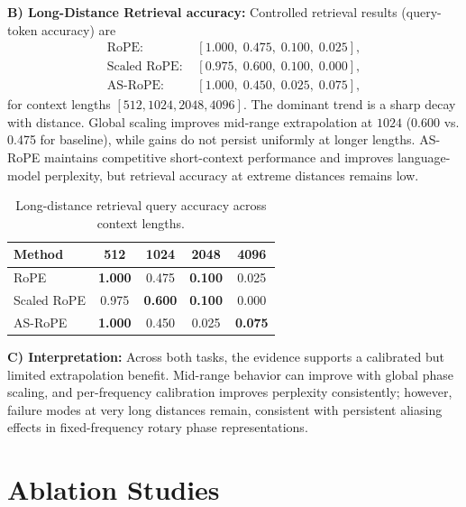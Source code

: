\documentclass[conference]{IEEEtran}
\begin{document}
\textbf{B) Long-Distance Retrieval accuracy:} Controlled retrieval results (query-token accuracy) are
\begin{align}
\text{RoPE: } & [1.000,\;0.475,\;0.100,\;0.025], \\
\text{Scaled RoPE: } & [0.975,\;0.600,\;0.100,\;0.000], \\
\text{AS-RoPE: } & [1.000,\;0.450,\;0.025,\;0.075],
\end{align}
for context lengths $[512,1024,2048,4096]$. The dominant trend is a sharp decay with distance. Global scaling improves mid-range extrapolation at $1024$ (0.600 vs. 0.475 for baseline), while gains do not persist uniformly at longer lengths. AS-RoPE maintains competitive short-context performance and improves language-model perplexity, but retrieval accuracy at extreme distances remains low.


\begin{table}[t]
\centering
\caption{Long-distance retrieval query accuracy across context lengths.}
\label{tab:ldr_acc}
\begin{tabular}{lcccc}
\toprule
\textbf{Method} & \textbf{512} & \textbf{1024} & \textbf{2048} & \textbf{4096} \\
\midrule
RoPE        & \textbf{1.000} & 0.475 & \textbf{0.100} & 0.025 \\
Scaled RoPE & 0.975 & \textbf{0.600} & \textbf{0.100} & 0.000 \\
AS-RoPE     & \textbf{1.000} & 0.450 & 0.025 & \textbf{0.075} \\
\bottomrule
\end{tabular}
\end{table}

\textbf{C) Interpretation:} Across both tasks, the evidence supports a calibrated but limited extrapolation benefit. Mid-range behavior can improve with global phase scaling, and per-frequency calibration improves perplexity consistently; however, failure modes at very long distances remain, consistent with persistent aliasing effects in fixed-frequency rotary phase representations.

\section{Ablation Studies}
\end{document}
